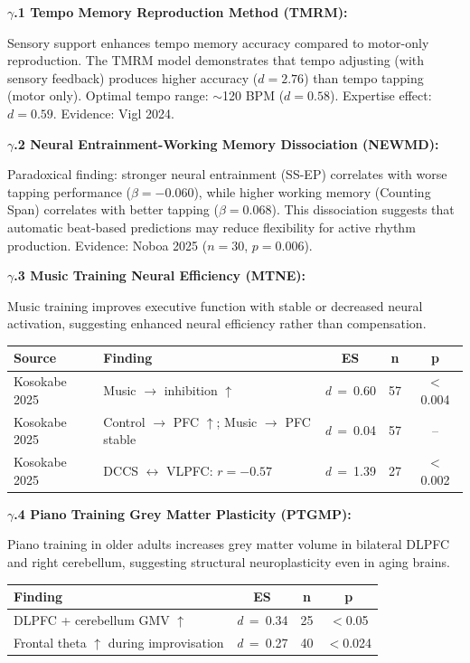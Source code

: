 \documentclass[9pt,onecolumn]{article}
\newcommand{\cohend}[1]{\textit{d}~=~#1}
\begin{document}
\textbf{$\gamma$.1 Tempo Memory Reproduction Method (TMRM):}

Sensory support enhances tempo memory accuracy compared to motor-only reproduction. The TMRM model demonstrates that tempo adjusting (with sensory feedback) produces higher accuracy ($d=2.76$) than tempo tapping (motor only). Optimal tempo range: $\sim$120 BPM ($d=0.58$). Expertise effect: $d=0.59$. Evidence: Vigl 2024.

\textbf{$\gamma$.2 Neural Entrainment-Working Memory Dissociation (NEWMD):}

Paradoxical finding: stronger neural entrainment (SS-EP) correlates with worse tapping performance ($\beta = -0.060$), while higher working memory (Counting Span) correlates with better tapping ($\beta = 0.068$). This dissociation suggests that automatic beat-based predictions may reduce flexibility for active rhythm production. Evidence: Noboa 2025 ($n=30$, $p=0.006$).

\textbf{$\gamma$.3 Music Training Neural Efficiency (MTNE):}

Music training improves executive function with stable or decreased neural activation, suggesting enhanced neural efficiency rather than compensation.

\begin{center}
\small
\begin{tabular}{@{}llccc@{}}
\toprule
\textbf{Source} & \textbf{Finding} & \textbf{ES} & \textbf{n} & \textbf{p} \\
\midrule
Kosokabe 2025 & Music $\rightarrow$ inhibition $\uparrow$ & \cohend{0.60} & 57 & $<$0.004 \\
Kosokabe 2025 & Control $\rightarrow$ PFC $\uparrow$; Music $\rightarrow$ PFC stable & \cohend{0.04} & 57 & -- \\
Kosokabe 2025 & DCCS $\leftrightarrow$ VLPFC: $r=-0.57$ & \cohend{1.39} & 27 & $<$0.002 \\
\bottomrule
\end{tabular}
\end{center}

\textbf{$\gamma$.4 Piano Training Grey Matter Plasticity (PTGMP):}

Piano training in older adults increases grey matter volume in bilateral DLPFC and right cerebellum, suggesting structural neuroplasticity even in aging brains.

\begin{center}
\small
\begin{tabular}{@{}lccc@{}}
\toprule
\textbf{Finding} & \textbf{ES} & \textbf{n} & \textbf{p} \\
\midrule
DLPFC + cerebellum GMV $\uparrow$ & \cohend{0.34} & 25 & $<$0.05 \\
Frontal theta $\uparrow$ during improvisation & \cohend{0.27} & 40 & $<$0.024 \\
\bottomrule
\end{tabular}
\end{center}
\end{document}

